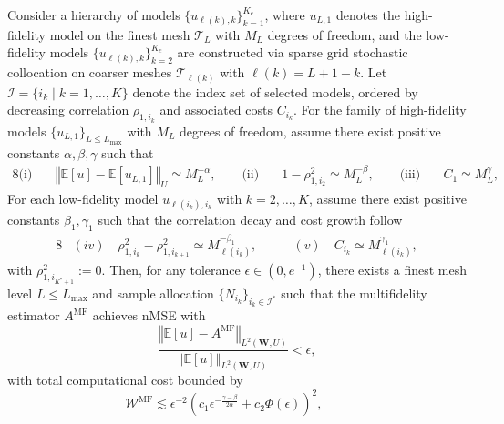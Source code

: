 %
\begin{theorem}\label{thm:Sample_cost_est}
Consider a hierarchy of models $\{u_{\ell(k),k}\}_{k=1}^{K_c}$, where $u_{L,1}$ denotes the high-fidelity model on the finest mesh $\mathcal{T}_L$ with $M_L$ degrees of freedom, and the low-fidelity models $\{u_{\ell(k),k}\}_{k=2}^{K_c}$ are constructed via sparse grid stochastic collocation on coarser meshes $\mathcal{T}_{\ell(k)}$ with $\ell(k) = L + 1 - k$. Let $\mathcal{I} = \{i_k \mid k = 1, \dots, K\}$ denote the index set of selected models, ordered by decreasing correlation $\rho_{1,i_k}$ and associated costs $C_{i_k}$. For the family of high-fidelity models $\{u_{L,1}\}_{L\le L_{\max}}$ with $M_L$ degrees of freedom, assume  there exist positive constants $\alpha, \beta, \gamma$ such that
%
\begin{alignat*}{8}
    \text{(i)}\quad & \left\Vert \mathbb{E}[u] - \mathbb{E}[u_{L,1}] \right\Vert_U \simeq M_L^{-\alpha}, \qquad
    \text{(ii)}\quad & 1 - \rho_{1,i_2}^2 \simeq M_L^{-\beta}, \qquad
    \text{(iii)}\quad & C_1 \simeq M_L^{\gamma},
\end{alignat*}
%
For each low-fidelity model $u_{\ell(i_k),i_k}$ with $k = 2, \dots, K$, assume there exist positive constants $\beta_1, \gamma_1$ such that the correlation decay and cost growth follow
%
\begin{alignat*}{8}
    &(iv)\quad \rho_{1,i_k}^2-\rho_{1,i_{k+1}}^2 \simeq M_{\ell(i_k)}^{-\beta_1},
    \qquad
&(v)\quad C_{i_k} \simeq M_{\ell(i_k)}^{\gamma_1},
\end{alignat*}
%
with $\rho_{1,i_{K^*+1}}^2 := 0$. Then, for any tolerance $\epsilon \in (0, e^{-1})$, there exists a finest mesh level $L \le L_{\max}$ and sample allocation $\{N_{i_k}\}_{i_k \in \mathcal{I}^*}$ such that the multifidelity estimator $A^{\mathrm{MF}}$ achieves nMSE  with
%
\[
\frac{\left\Vert \mathbb{E}[u] - A^{\mathrm{MF}} \right\Vert_{L^2(\boldsymbol{W},U)}}{\left\Vert \mathbb{E}[u] \right\Vert_{L^2(\boldsymbol{W},U)}} < \epsilon,
\]
%
with total computational cost bounded by
%
\begin{equation}\label{eq:lfm_scaling}
\mathcal{W}^{\mathrm{MF}} \lesssim \epsilon^{-2} \left( c_1 \epsilon^{-\frac{\gamma-\beta}{2\alpha}} + c_2 \Phi(\epsilon) \right)^2,\qquad 

\end{equation}
\end{theorem}
